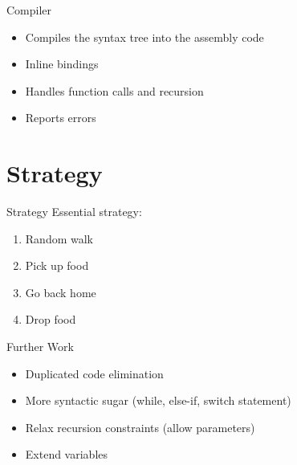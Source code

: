 \documentclass{beamer}
\begin{document}
\begin{frame}{Compiler}
	\begin{itemize}
		\item Compiles the syntax tree into the assembly code
		\item Inline bindings
		\item Handles function calls and recursion
		\item Reports errors
	\end{itemize}
\end{frame}

\section{Strategy}

\begin{frame}{Strategy}
	Essential strategy:
	\begin{enumerate}	
		\item Random walk
		\item Pick up food
		\item Go back home
		\item Drop food
	\end{enumerate}
\end{frame}

\begin{frame}{Further Work}
    \begin{itemize}
        \item Duplicated code elimination
        \item More syntactic sugar (while, else-if, switch statement)
        \item Relax recursion constraints (allow parameters)
       	\item Extend variables
    \end{itemize}
\end{frame}
\end{document}
